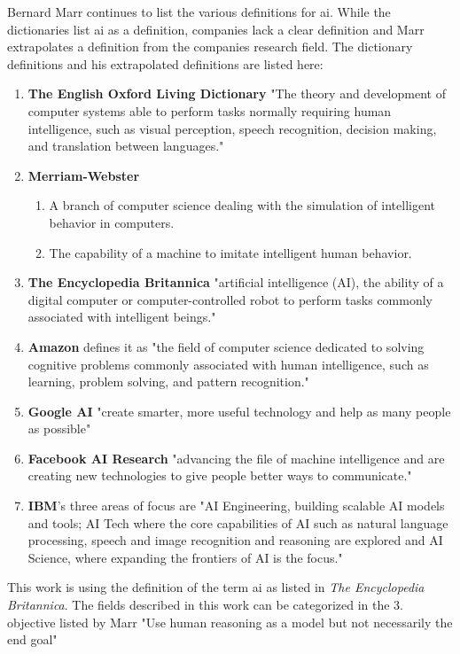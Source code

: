\documentclass[10pt,a4paper]{article}
\begin{document}
Bernard Marr continues to list the various definitions for \gls{ai}. While the dictionaries list \gls{ai} as a definition, companies lack a clear definition and Marr extrapolates a definition from the companies research field. The dictionary definitions and his extrapolated definitions are listed here:
\begin{enumerate}
\item \textbf{The English Oxford Living Dictionary} "The theory and development of computer systems able to perform tasks normally requiring human intelligence, such as visual perception, speech recognition, decision making, and translation between languages."
\item \textbf{Merriam-Webster}
\begin{enumerate}
\item A branch of computer science dealing with the simulation of intelligent behavior in computers.
\item The capability of a machine to imitate intelligent human behavior.
\end{enumerate}
\item \textbf{The Encyclopedia Britannica} "artificial intelligence (AI), the ability of a digital computer or computer-controlled robot to perform tasks commonly associated with intelligent beings."
\item \textbf{Amazon} defines it as "the field of computer science dedicated to solving cognitive problems commonly associated with human intelligence, such as learning, problem solving, and pattern recognition."
\item \textbf{Google AI} "create smarter, more useful technology and help as many people as possible"
\item \textbf{Facebook AI Research} "advancing the file of machine intelligence and are creating new technologies to give people better ways to communicate."
\item \textbf{IBM}'s three areas of focus are "AI Engineering, building scalable AI models and tools; AI Tech where the core capabilities of AI such as natural language processing, speech and image recognition and reasoning are explored and AI Science, where expanding the frontiers of AI is the focus."\cite{Marr2018}
\end{enumerate}
This work is using the definition of the term \gls{ai} as listed in \textit{The Encyclopedia Britannica}. The fields described in this work can be categorized in the 3. objective listed by Marr "Use human reasoning as a model but not necessarily the end goal"\cite{Marr2018}
\end{document}
